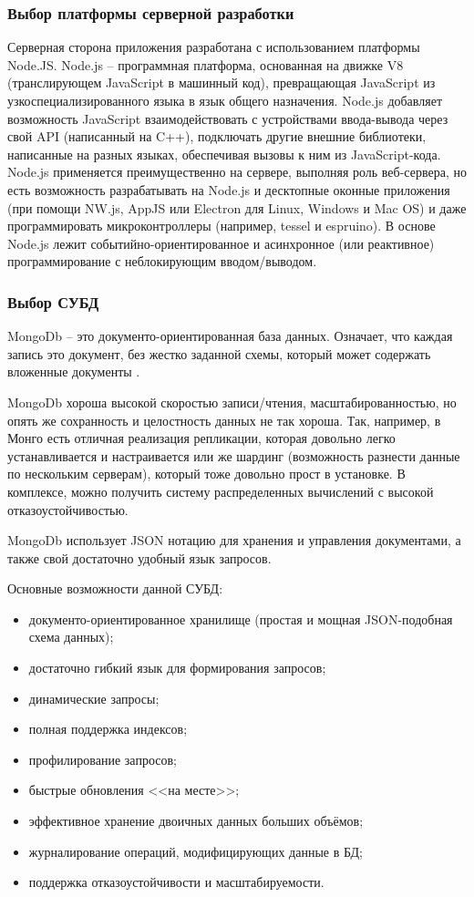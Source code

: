 \subsubsection{Выбор платформы серверной разработки}

Серверная сторона приложения разработана с использованием платформы Node.JS.
Node.js -- программная платформа, основанная на движке V8 (транслирующем JavaScript в машинный код), превращающая JavaScript из узкоспециализированного языка в язык общего назначения. Node.js добавляет возможность JavaScript взаимодействовать с устройствами ввода-вывода через свой API (написанный на C++), подключать другие внешние библиотеки, написанные на разных языках, обеспечивая вызовы к ним из JavaScript-кода. Node.js применяется преимущественно на сервере, выполняя роль веб-сервера, но есть возможность разрабатывать на Node.js и десктопные оконные приложения (при помощи NW.js, AppJS или Electron для Linux, Windows и Mac OS) и даже программировать микроконтроллеры (например, tessel и espruino). В основе Node.js лежит событийно-ориентированное и асинхронное (или реактивное) программирование с неблокирующим вводом/выводом.

\subsubsection{Выбор СУБД}

MongoDb -- это документо-ориентированная база данных. Означает, что каждая запись это документ, без жестко заданной схемы, который может содержать вложенные документы \cite{mongodb}.

MongoDb хороша высокой скоростью записи/чтения, масштабированностью, но опять же сохранность и целостность данных не так хороша. Так, например, в Монго есть отличная реализация репликации, которая довольно легко устанавливается и настраивается или же шардинг (возможность разнести данные по нескольким серверам), который тоже довольно прост в установке. В комплексе, можно получить систему распределенных вычислений с высокой отказоустойчивостью.

MongoDb использует JSON нотацию для хранения и управления документами, а также свой достаточно удобный язык запросов.

Основные возможности данной СУБД:
\begin{itemize}
  \item документо-ориентированное хранилище (простая и мощная JSON-подобная схема данных);
  \item достаточно гибкий язык для формирования запросов;
  \item динамические запросы;
  \item полная поддержка индексов;
  \item профилирование запросов;
  \item быстрые обновления <<на месте>>;
  \item эффективное хранение двоичных данных больших объёмов;
  \item журналирование операций, модифицирующих данные в БД;
  \item поддержка отказоустойчивости и масштабируемости.
\end{itemize}

